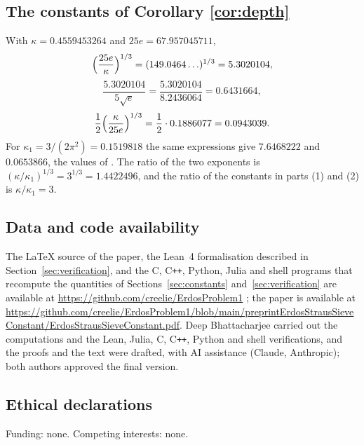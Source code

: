 \documentclass{amsart}
\theoremstyle{definition}
\theoremstyle{remark}
\numberwithin{equation}{section}
\newcommand{\repoURL}{https://github.com/creelie/ErdosProblem1}
\newcommand{\preprintURL}{https://github.com/creelie/ErdosProblem1/blob/main/preprintErdosStrausSieveConstant/ErdosStrausSieveConstant.pdf}
\begin{document}
\subsection{The constants of Corollary \ref{cor:depth}}\label{app:corollary}
With $\kappa=0.4559453264$ and $25e=67.957045711$,
\[
\Bigl(\frac{25e}{\kappa}\Bigr)^{1/3}=(149.0464\ldots)^{1/3}=5.3020104,
\]
\[
\frac{5.3020104}{5\sqrt e}=\frac{5.3020104}{8.2436064}=0.6431664,
\]
\[
\frac12\Bigl(\frac{\kappa}{25e}\Bigr)^{1/3}=\frac12\cdot0.1886077=0.0943039.
\]
For $\kappa_1=3/(2\pi^2)=0.1519818$ the same expressions give $7.6468222$ and $0.0653866$, the values of \cite[Corollary~4.31]{Dah}. The ratio of the two exponents is $(\kappa/\kappa_1)^{1/3}=3^{1/3}=1.4422496$, and the ratio of the constants in parts (1) and (2) is $\kappa/\kappa_1=3$.

\subsection*{Data and code availability}
\begingroup\raggedright
The \LaTeX{} source of the paper, the Lean~4 formalisation described in Section~\ref{sec:verification}, and the C, C\texttt{++}, Python, Julia and shell programs that recompute the quantities of Sections~\ref{sec:constants} and~\ref{sec:verification} are available at \url{\repoURL} \cite{archive}; the paper is available at \url{\preprintURL}. Deep Bhattacharjee carried out the computations and the Lean, Julia, C, C\texttt{++}, Python and shell verifications, and the proofs and the text were drafted, with AI assistance (Claude, Anthropic); both authors approved the final version.\par
\endgroup

\subsection*{Ethical declarations}
Funding: none. Competing interests: none.
\end{document}
